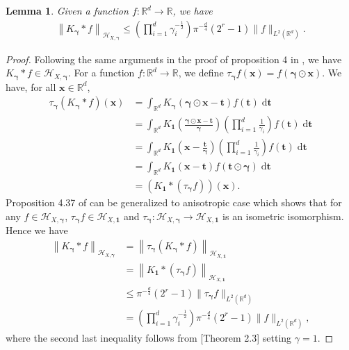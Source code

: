 \documentclass[11pt]{article}
\newcommand{\bgamma}{\boldsymbol{\gamma}}
\newcommand{\bt}{\boldsymbol{t}}
\newcommand{\bx}{\mathbf x}
\newcommand{\calH}{\mathcal{H}}
\newcommand{\R}{\mathbb{R}}
\newcommand{\0}{\mathbf{0}}
\newtheorem{lem}{Lemma}[section]
\begin{document}
\begin{appendix}
\begin{lem}\label{lem:hang_prop_4}
Given a function $f:\R^{d}\to\R$, we have
\begin{align*}
    \left\|K_{\bgamma}\ast f \right\|_{\calH_{X,\bgamma}} \leq \left(\prod_{i=1}^{d}\gamma_i^{-\frac{1}{2}}\right)\pi^{-\frac{d}{4}}(2^r - 1)\|f\|_{L^2(\R^d)}.
\end{align*}
\end{lem}
\begin{proof}
Following the same arguments in the proof of proposition 4 in \cite{hang2021optimal}, we have $ K_{\bgamma} \ast f \in \calH_{X,\bgamma}$.
For a function $f:\R^{d}\to\R$, we define $\tau_{\bgamma}f(\bx) = f(\bgamma\odot \bx)$. We have, for all $\bx \in \R^d$, 
\begin{align*}
    \tau_{\bgamma}\left(K_{\bgamma} \ast f\right)(\bx) &= \int_{\R^d}K_{\bgamma} \left( \bgamma \odot \bx - \bt \right) f(\bt) \;\mathrm{d}\bt \\
    &=  \int_{\R^d}K_{\mathbf{1}}\left(\frac{\bgamma \odot \bx - \bt}{\bgamma}\right)\left(\prod_{i=1}^{d}\frac{1}{\gamma_i} \right)f(\bt)\;\mathrm{d}\bt\\
    &= \int_{\R^d}K_{\mathbf{1}}\left(\bx - \frac{\bt}{\bgamma}\right)\left(\prod_{i=1}^{d}\frac{1}{\gamma_i} \right)f\left( \bt \right)\;\mathrm{d}\bt\\
    &= \int_{\R^d}K_{\mathbf{1}}\left(\bx - \bt\right)f\left(\bt \odot\bgamma\right)\;\mathrm{d}\bt\\
    &= (K_{\mathbf{1}}\ast (\tau_{\bgamma}f))(\bx) .
\end{align*}
Proposition 4.37 of \cite{steinwart2008support} can be generalized to anisotropic case which shows that for any  
$f \in \calH_{X,\bgamma}$, $\tau_{\bgamma} f \in \calH_{X, \mathbf{1}}$ and 
$\tau_{\bgamma}: \calH_{X,\bgamma} \to \calH_{X, \mathbf{1}}$ is an isometric isomorphism.  Hence we have
\begin{align*}
    \left\|K_{\bgamma}\ast f \right\|_{\calH_{X,\bgamma}} &= \left\|\tau_{\bgamma}\left(K_{\bgamma}\ast f\right) \right\|_{\calH_{X, \mathbf{1}}}\\
    &= \left\|K_{\mathbf{1}}\ast (\tau_{\bgamma}f)\right\|_{\calH_{X, \mathbf{1}}}\\
    &\leq \pi^{-\frac{d}{4}}(2^r - 1) \|\tau_{\bgamma}f\|_{L^2(\R^d)}\\
    &= \left(\prod_{i=1}^{d}\gamma_i^{-\frac{1}{2}}\right)\pi^{-\frac{d}{4}}(2^r - 1)\|f\|_{L^2(\R^d)},
\end{align*}
where the second last inequality follows from \cite{eberts2013optimal}[Theorem 2.3] setting $\gamma=1$.

\end{proof}
\end{appendix}
\end{document}
